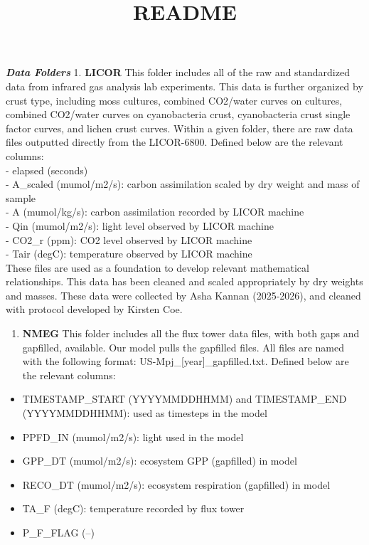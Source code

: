 \documentclass[
]{article}
\title{README}
\author{}
\date{\vspace{-2.5em}}
\providecommand{\tightlist}{%
  \setlength{\itemsep}{0pt}\setlength{\parskip}{0pt}}
\begin{document}
\maketitle

\textbf{\emph{Data Folders}} 1. \textbf{LICOR} This folder includes all
of the raw and standardized data from infrared gas analysis lab
experiments. This data is further organized by crust type, including
moss cultures, combined CO2/water curves on cultures, combined CO2/water
curves on cyanobacteria crust, cyanobacteria crust single factor curves,
and lichen crust curves. Within a given folder, there are raw data files
outputted directly from the LICOR-6800. Defined below are the relevant
columns:\\
- elapsed (seconds)\\
- A\_scaled (mumol/m2/s): carbon assimilation scaled by dry weight and
mass of sample\\
- A (mumol/kg/s): carbon assimilation recorded by LICOR machine\\
- Qin (mumol/m2/s): light level observed by LICOR machine\\
- CO2\_r (ppm): CO2 level observed by LICOR machine\\
- Tair (degC): temperature observed by LICOR machine\\

These files are used as a foundation to develop relevant mathematical
relationships. This data has been cleaned and scaled appropriately by
dry weights and masses. These data were collected by Asha Kannan
(2025-2026), and cleaned with protocol developed by Kirsten Coe.\\

\begin{enumerate}
\def\labelenumi{\arabic{enumi}.}
\setcounter{enumi}{1}
\tightlist
\item
  \textbf{NMEG} This folder includes all the flux tower data files, with
  both gaps and gapfilled, available. Our model pulls the gapfilled
  files. All files are named with the following format:
  US-Mpj\_{[}year{]}\_gapfilled.txt. Defined below are the relevant
  columns:\\
\end{enumerate}

\begin{itemize}
\tightlist
\item
  TIMESTAMP\_START (YYYYMMDDHHMM) and TIMESTAMP\_END (YYYYMMDDHHMM):
  used as timesteps in the model\\
\item
  PPFD\_IN (mumol/m2/s): light used in the model\\
\item
  GPP\_DT (mumol/m2/s): ecosystem GPP (gapfilled) in model\\
\item
  RECO\_DT (mumol/m2/s): ecosystem respiration (gapfilled) in model\\
\item
  TA\_F (degC): temperature recorded by flux tower\\
\item
  P\_F\_FLAG (--)\\
\end{itemize}
\end{document}
